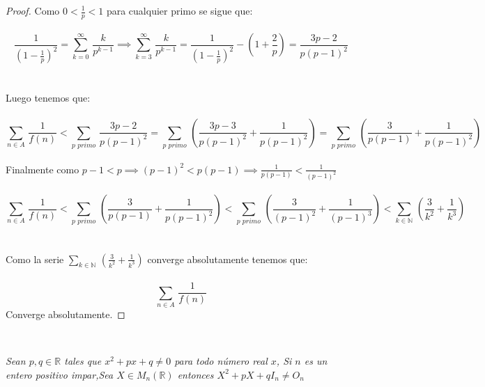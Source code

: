 \documentclass[11pt,letterpaper]{article}
\newcommand{\R}{\mathbb{R}}
\newcommand{\N}{\mathbb{N}}
\begin{document}
\begin{proof}
    Como $0<\frac{1}{p}<1$ para cualquier primo se sigue que:\,\\
    \,\\
    \begin{equation*}
        \frac{1}{\left(1-\frac{1}{p}\right)^2}=\sum_{k=0}^{\infty}\,\frac{k}{p^{k-1}}\implies \sum_{k=3}^{\infty}\,\frac{k}{p^{k-1}}=\frac{1}{\left(1-\frac{1}{p}\right)^2}-\left(1+\frac{2}{p}\right)=\frac{3p-2}{p(p-1)^2}
    \end{equation*}\,\\
    \,\\
    Luego tenemos que:\,\\
    \,\\
    \begin{equation*}
        \sum_{n\in A}\,\frac{1}{f(n)}<\sum_{p\,\,primo}\,\frac{3p-2}{p(p-1)^2}=\sum_{p\,\,primo}\,\left(\frac{3p-3}{p(p-1)^2}+\frac{1}{p(p-1)^2}\right)=\sum_{p\,\,primo}\,\left(\frac{3}{p(p-1)}+\frac{1}{p(p-1)^2}\right)
    \end{equation*}\,\\
    Finalmente como $p-1<p\implies (p-1)^2<p(p-1)\implies \frac{1}{p(p-1)}<\frac{1}{(p-1)^2}$\,\\
    \,\\
    \begin{equation*}
        \sum_{n\in A}\,\frac{1}{f(n)}<\sum_{p\,\,primo}\,\left(\frac{3}{p(p-1)}+\frac{1}{p(p-1)^2}\right)<\sum_{p\,\,primo}\,\left(\frac{3}{(p-1)^2}+\frac{1}{(p-1)^3}\right)<\displaystyle\sum_{k\in \N}\,\left(\frac{3}{k^2}+\frac{1}{k^3}\right)
    \end{equation*}\,\\
    \,\\
    Como la serie $\displaystyle\sum_{k\in \N}\,\left(\frac{3}{k^2}+\frac{1}{k^3}\right)$ converge absolutamente tenemos que:\,\\
    \,\\
\begin{equation*}
    \sum_{n\in A}\,\frac{1}{f(n)}
\end{equation*}
Converge absolutamente.
\end{proof}\,\\
\begin{tcolorbox}[
	title = \textcolor{black}{\textcolor{white}{Problema 3}},]
\textit{Sean $p,q\in \R$ tales que $x^2+px+q\neq 0$ para todo n\'umero real $x$, Si $n$ es un entero positivo impar,Sea
$X\in M_n(\R)$ entonces $X^2+pX+qI_n\neq O_n$
}
\end{tcolorbox}
\end{document}
